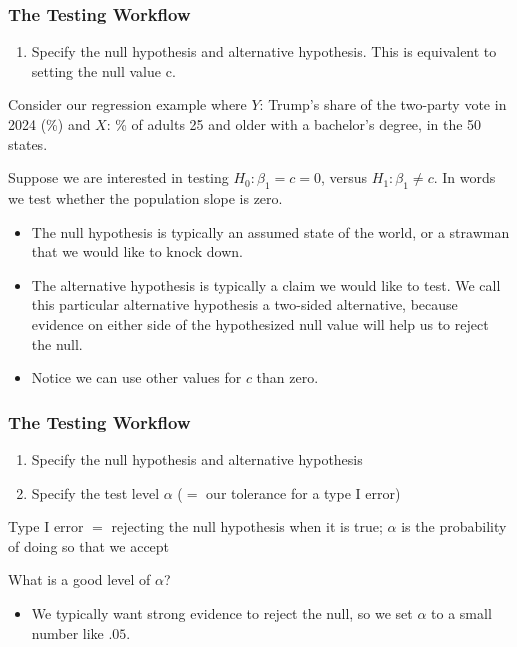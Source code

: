 \documentclass[xcolor=svgnames,9pt,english,aspectratio=169,t]{beamer}
\begin{document}
\begin{frame}[t]
\frametitle{The Testing Workflow}
\small
\begin{enumerate}
\item Specify the \alert{null hypothesis} and \alert{alternative hypothesis}.
This is equivalent to setting the \alert{null value} c.
\end{enumerate}\medskip

Consider our regression example where $Y$: Trump's share of the two-party vote in 2024 (\%) and $X$: \% of adults 25 and older with a bachelor's degree, in the 50 states.\\\medskip

Suppose we are interested in testing $H_0: \beta_1 = c = 0$, versus $H_1: \beta_1 \ne c$. In words
we test whether \pause the population slope is zero.

\pause
\begin{itemize}
\item The null hypothesis is typically an assumed state of the world, or a strawman that we would like to knock down.\medskip\pause
\item The alternative hypothesis is typically a claim we would like to test. We call this particular alternative hypothesis a two-sided alternative, because evidence on either side of the hypothesized null value will help us to reject the null.\medskip \pause
    \item Notice we can use other values for $c$ than zero.
\end{itemize}

\end{frame}

\begin{frame}[t]
\frametitle{The Testing Workflow}
\small
\begin{enumerate}
\item Specify the \alert{null hypothesis} and \alert{alternative hypothesis}
\item Specify the test level $\alpha$ ($=$ our tolerance for a type I error)
\end{enumerate}
{\small
Type I error $=$ \pause rejecting the null hypothesis when it is true; $\alpha$ is the probability of doing so that we accept
}
\medskip\pause

What is a good level of $\alpha$?\\\pause

\begin{itemize}
\item We typically want strong evidence to reject the null, so we set $\alpha$ to a small number like $.05$.
\end{itemize}

\end{frame}
\end{document}

